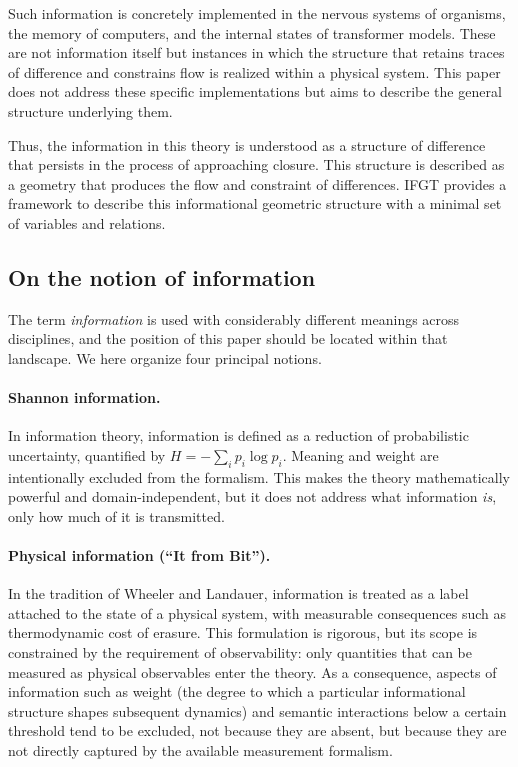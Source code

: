 Such information is concretely implemented in the nervous systems of organisms, the memory of computers, and the internal states of transformer models. These are not information itself but instances in which the structure that retains traces of difference and constrains flow is realized within a physical system. This paper does not address these specific implementations but aims to describe the general structure underlying them.

Thus, the information in this theory is understood as a structure of difference that persists in the process of approaching closure. This structure is described as a geometry that produces the flow and constraint of differences. IFGT provides a framework to describe this informational geometric structure with a minimal set of variables and relations.

\subsection{On the notion of information}
\label{subsec:notion_of_information}

The term \emph{information} is used with considerably different meanings across disciplines, and the position of this paper should be located within that landscape. We here organize four principal notions.

\paragraph{Shannon information.}
In information theory, information is defined as a reduction of probabilistic uncertainty, quantified by $H = -\sum_i p_i \log p_i$. Meaning and weight are intentionally excluded from the formalism. This makes the theory mathematically powerful and domain-independent, but it does not address what information \emph{is}, only how much of it is transmitted.

\paragraph{Physical information (``It from Bit'').}
In the tradition of Wheeler and Landauer, information is treated as a label attached to the state of a physical system, with measurable consequences such as thermodynamic cost of erasure. This formulation is rigorous, but its scope is constrained by the requirement of observability: only quantities that can be measured as physical observables enter the theory. As a consequence, aspects of information such as weight (the degree to which a particular informational structure shapes subsequent dynamics) and semantic interactions below a certain threshold tend to be excluded, not because they are absent, but because they are not directly captured by the available measurement formalism.

